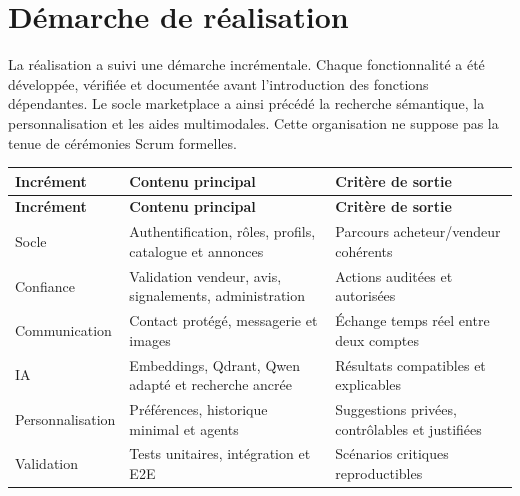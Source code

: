 \section{Démarche de réalisation}

La réalisation a suivi une démarche incrémentale. Chaque fonctionnalité a été développée, vérifiée et documentée avant l'introduction des fonctions dépendantes. Le socle marketplace a ainsi précédé la recherche sémantique, la personnalisation et les aides multimodales. Cette organisation ne suppose pas la tenue de cérémonies Scrum formelles.


{\small\singlespacing{}
\begin{longtable}{|>{\raggedright\arraybackslash}p{}|>{\raggedright\arraybackslash}p{}|>{\raggedright\arraybackslash}p{}|}
\hline
\rowcolor{tablehead} \color{white}\bfseries Incrément & \color{white}\bfseries Contenu principal & \color{white}\bfseries Critère de sortie \\ \hline
\endfirsthead
\rowcolor{tablehead} \color{white}\bfseries Incrément & \color{white}\bfseries Contenu principal & \color{white}\bfseries Critère de sortie \\ \hline
\endhead
\hline\endfoot
Socle & Authentification, rôles, profils, catalogue et annonces & Parcours acheteur/vendeur cohérents \\ \hline
\rowcolor{tablerow} Confiance & Validation vendeur, avis, signalements, administration & Actions auditées et autorisées \\ \hline
Communication & Contact protégé, messagerie et images & Échange temps réel entre deux comptes \\ \hline
\rowcolor{tablerow} IA & Embeddings, Qdrant, Qwen adapté et recherche ancrée & Résultats compatibles et explicables \\ \hline
Personnalisation & Préférences, historique minimal et agents & Suggestions privées, contrôlables et justifiées \\ \hline
\rowcolor{tablerow} Validation & Tests unitaires, intégration et E2E & Scénarios critiques reproductibles \\ \hline
\end{longtable}
}

